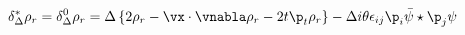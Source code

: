 \begin{equation}
     \delta_{\Delta}^*\rho_{r}=\delta_{\Delta}^0\rho_{r}
     =\Delta\left\{
     2\rho_{r}-\vx\cdot\vnabla\rho_{r}-2t\p_{t}\rho_{r}\right\}
     -\Delta i\theta\epsilon_{ij}\p_{i}\bar{\psi}\star\p_{j}\psi
     \label{exodilondens}
\end{equation}

